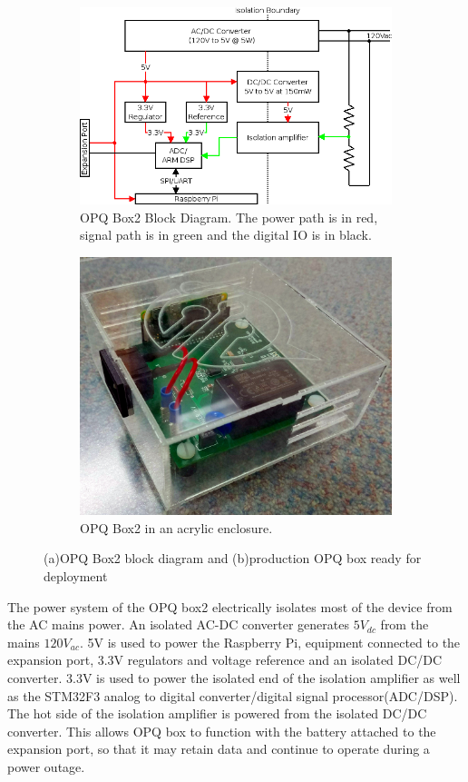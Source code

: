 \begin{figure}[h]
	\centering
	\begin{subfigure}{.5\textwidth}
	  \centering
	  \includegraphics[width=0.9\linewidth]{img/opqbox_diagram.png}
	  \caption{OPQ Box2 Block Diagram. The power path is in red, signal path is in green and the digital IO is in black.}
	  \label{fig2:sub1}
	\end{subfigure}%
	\begin{subfigure}{.5\textwidth}
	  \centering
	  \includegraphics[width=0.7\linewidth]{img/opqbox_photo.jpg}
	  \caption{OPQ Box2 in an acrylic enclosure.}
	  \label{fig2:sub2}
	\end{subfigure}
	\caption{(a)OPQ Box2 block diagram and (b)production OPQ box ready for deployment}
	\label{fig:2}
\end{figure}

The power system of the OPQ box2 electrically isolates most of the device from the AC mains power. An isolated AC-DC converter generates $5V_{dc}$ from the mains $120V_{ac}$. 5V is used to power the Raspberry Pi, equipment connected to the expansion port, 3.3V regulators and voltage reference and an isolated DC/DC converter. 3.3V is used to power the isolated end of the isolation amplifier as well as the STM32F3 analog to digital converter/digital signal processor(ADC/DSP). The hot side of the isolation amplifier is powered from the isolated DC/DC converter. This allows OPQ box to function with the battery attached to the expansion port, so that it may retain data and continue to operate during a power outage. 

